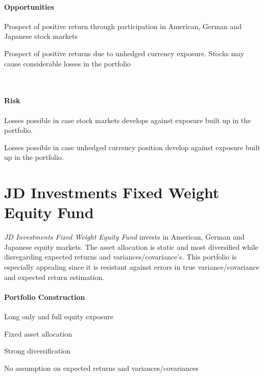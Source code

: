 \documentclass[11pt, DIV=15]{scrreprt}
\begin{document}
\begin{minipage}[t]{0.49\textwidth}
  \paragraph{Opportunities}
  \begin{sit}
  \item Prospect of positive return through participation in American, German and Japanese stock markets
  \item Prospect of positive returns due to unhedged currency exposure. Stocks may cause considerable losses in the portfolio
  \end{sit}
\end{minipage}
~~
\begin{minipage}[t]{0.49\textwidth}
  \paragraph{Risk}
  \begin{sit}
  \item Losses possible in case stock markets develops against exposure built up in the portfolio.
  \item Losses possible in case unhedged currency position develop against exposure built up in the portfolio.
  \end{sit}
\end{minipage}

\newpage\section*{JD Investments Fixed Weight Equity Fund }
\textit{JD Investments Fixed Weight Equity Fund} invests in American, German and Japanese equity markets. The asset allocation is static and most diversified while disregarding expected returns and variances/covariance’s. This portfolio is especially appealing since it is resistant against errors in true variance/covariance and expected return estimation.

\paragraph{Portfolio Construction}
\begin{sit}
\item	Long only and full equity exposure
\item	Fixed asset allocation
\item	Strong diversification
\item	No assumption on expected returns and variances/covariances
\end{sit}
\end{document}
